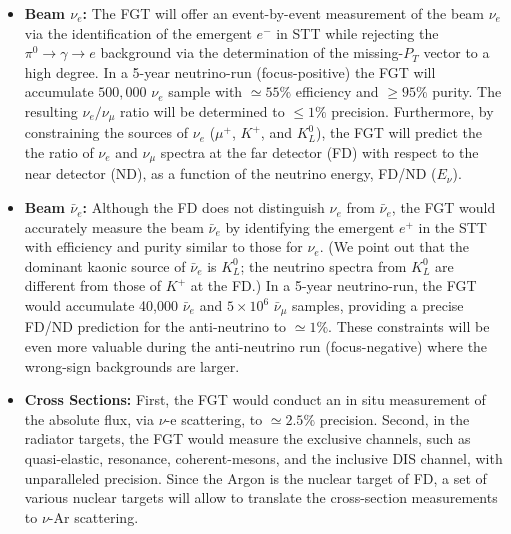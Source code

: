 \begin{itemize}
    \item {\bf Beam $\nu_e$:} The FGT will offer an event-by-event  measurement of the beam $\nu_e$ via the  identification 
    of the emergent $e^-$ in STT while rejecting the $\pi^0 \rightarrow \gamma \rightarrow e$  
    background via the determination of the missing-$P_T$ vector to a high degree.  In a 5-year neutrino-run (focus-positive) 
    the FGT will accumulate $500,000$ $\nu_e$ sample with $\simeq 55\%$ efficiency and  $\geq 95\%$ purity.  
    The resulting $\nu_e / \nu_\mu$ ratio will be determined to  $\leq 1\%$ precision. Furthermore, 
    by constraining the sources of $\nu_e$ ($\mu^+$, $K^+$, and $K^0_L$),   the FGT will predict the the ratio of  
    $\nu_e$ and $\nu_\mu$ spectra at the far detector (FD) with respect to the near detector (ND), as a function 
    of the neutrino energy, FD/ND ($E_\nu$).    

    \item {\bf  Beam $\bar\nu_e$:} Although the FD does not distinguish $\nu_e$ from $\bar\nu_e$, the FGT would 
    accurately measure the beam $\bar\nu_e$ by identifying the emergent $e^+$ in the STT with efficiency and purity 
    similar to those for $\nu_e$.  (We point out that the dominant kaonic source of $\bar\nu_e$ is $K^0_L$; 
    the neutrino spectra from $K^0_L$ are different from those of $K^+$ at the FD.)  In a 5-year neutrino-run, the FGT 
    would accumulate 40,000 $\bar\nu_e$ and $5\times 10^6$ $\bar\nu_\mu$ samples, providing a precise FD/ND 
    prediction for the anti-neutrino to $\simeq 1\%$. 
    These constraints will be even more valuable during the anti-neutrino run (focus-negative) where the wrong-sign 
    backgrounds are larger.  

    \item {\bf  Cross Sections:} First, the FGT would conduct an in situ measurement of  the absolute flux, via $\nu$-e 
    scattering, to $\simeq 2.5\%$ precision. Second, in the radiator targets, the FGT would measure the exclusive channels, 
    such as quasi-elastic, resonance, coherent-mesons, and the inclusive DIS channel, with unparalleled precision. Since 
    the Argon is the nuclear target of FD, a set of various nuclear targets will allow to translate the cross-section   
    measurements to $\nu$-Ar scattering. 


\end{itemize}
